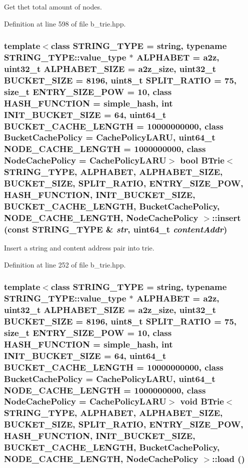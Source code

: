 Get thet total amount of nodes. 

Definition at line 598 of file b\_\-trie.hpp.\hypertarget{classBTrie_7cec73d8ae32a6d049f3e801f6ee75f3}{
\subsubsection[{insert}]{\setlength{\rightskip}{0pt plus 5cm}template$<$class STRING\_\-TYPE  = string, typename STRING\_\-TYPE::value\_\-type $\ast$ ALPHABET = a2z, uint32\_\-t ALPHABET\_\-SIZE = a2z\_\-size, uint32\_\-t BUCKET\_\-SIZE = 8196, uint8\_\-t SPLIT\_\-RATIO = 75, size\_\-t ENTRY\_\-SIZE\_\-POW = 10, class HASH\_\-FUNCTION  = simple\_\-hash, int INIT\_\-BUCKET\_\-SIZE = 64, uint64\_\-t BUCKET\_\-CACHE\_\-LENGTH = 10000000000, class BucketCachePolicy  = CachePolicyLARU, uint64\_\-t NODE\_\-CACHE\_\-LENGTH = 1000000000, class NodeCachePolicy  = CachePolicyLARU$>$ bool {\bf BTrie}$<$ STRING\_\-TYPE, ALPHABET, ALPHABET\_\-SIZE, BUCKET\_\-SIZE, SPLIT\_\-RATIO, ENTRY\_\-SIZE\_\-POW, HASH\_\-FUNCTION, INIT\_\-BUCKET\_\-SIZE, BUCKET\_\-CACHE\_\-LENGTH, BucketCachePolicy, NODE\_\-CACHE\_\-LENGTH, NodeCachePolicy $>$::insert (const STRING\_\-TYPE \& {\em str}, \/  uint64\_\-t {\em contentAddr})}}
\label{classBTrie_7cec73d8ae32a6d049f3e801f6ee75f3}


Insert a string and content address pair into trie. 

Definition at line 252 of file b\_\-trie.hpp.\hypertarget{classBTrie_8808c1f6c8b72d7b72b70646ec661837}{
\subsubsection[{load}]{\setlength{\rightskip}{0pt plus 5cm}template$<$class STRING\_\-TYPE  = string, typename STRING\_\-TYPE::value\_\-type $\ast$ ALPHABET = a2z, uint32\_\-t ALPHABET\_\-SIZE = a2z\_\-size, uint32\_\-t BUCKET\_\-SIZE = 8196, uint8\_\-t SPLIT\_\-RATIO = 75, size\_\-t ENTRY\_\-SIZE\_\-POW = 10, class HASH\_\-FUNCTION  = simple\_\-hash, int INIT\_\-BUCKET\_\-SIZE = 64, uint64\_\-t BUCKET\_\-CACHE\_\-LENGTH = 10000000000, class BucketCachePolicy  = CachePolicyLARU, uint64\_\-t NODE\_\-CACHE\_\-LENGTH = 1000000000, class NodeCachePolicy  = CachePolicyLARU$>$ void {\bf BTrie}$<$ STRING\_\-TYPE, ALPHABET, ALPHABET\_\-SIZE, BUCKET\_\-SIZE, SPLIT\_\-RATIO, ENTRY\_\-SIZE\_\-POW, HASH\_\-FUNCTION, INIT\_\-BUCKET\_\-SIZE, BUCKET\_\-CACHE\_\-LENGTH, BucketCachePolicy, NODE\_\-CACHE\_\-LENGTH, NodeCachePolicy $>$::load ()}}
\label{classBTrie_8808c1f6c8b72d7b72b70646ec661837}


